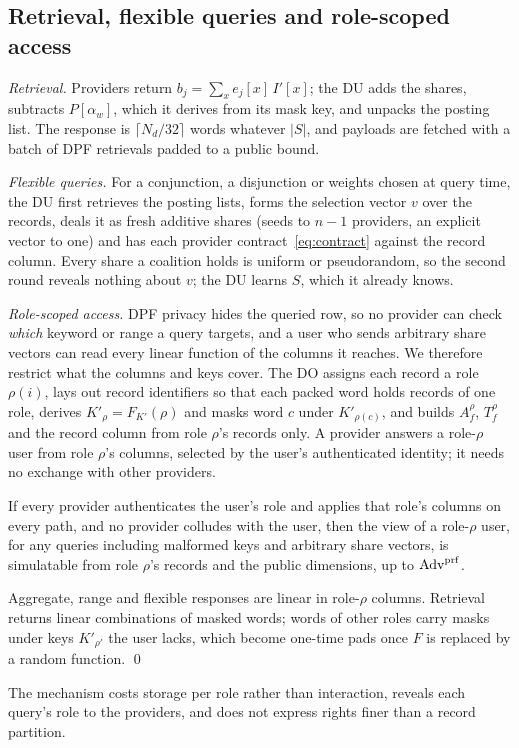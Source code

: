 \subsection{Retrieval, flexible queries and role-scoped access}
\label{sec:auth}
\emph{Retrieval.} Providers return $b_j=\sum_x e_j[x]\,I'[x]$; the DU adds the
shares, subtracts $P[\alpha_w]$, which it derives from its mask key, and
unpacks the posting list. The response is $\lceil N_d/32\rceil$ words whatever
$|S|$, and payloads are fetched with a batch of DPF retrievals padded to a
public bound.

\emph{Flexible queries.} For a conjunction, a disjunction or weights chosen at
query time, the DU first retrieves the posting lists, forms the selection
vector $v$ over the records, deals it as fresh additive shares (seeds to $n-1$
providers, an explicit vector to one) and has each provider
contract~\eqref{eq:contract} against the record column. Every share a
coalition holds is uniform or pseudorandom, so the second round reveals
nothing about $v$; the DU learns $S$, which it already knows.

\emph{Role-scoped access.} DPF privacy hides the queried row, so no provider can
check \emph{which} keyword or range a query targets, and a user who sends
arbitrary share vectors can read every linear function of the columns it
reaches. We therefore restrict what the columns and keys cover. The DO assigns
each record a role $\rho(i)$, lays out record identifiers so that each packed
word holds records of one role, derives $K'_\rho=F_{K'}(\rho)$ and masks word
$c$ under $K'_{\rho(c)}$, and builds $A^{\rho}_f$, $T^{\rho}_f$ and the record
column from role $\rho$'s records only. A provider answers a role-$\rho$ user
from role $\rho$'s columns, selected by the user's authenticated identity; it
needs no exchange with other providers.

\begin{proposition}
\label{prop:role}
If every provider authenticates the user's role and applies that role's
columns on every path, and no provider colludes with the user, then the view of
a role-$\rho$ user, for any queries including malformed keys and arbitrary
share vectors, is simulatable from role $\rho$'s records and the public
dimensions, up to $\mathrm{Adv}^{\mathrm{prf}}$.
\end{proposition}
\begin{pf}
Aggregate, range and flexible responses are linear in role-$\rho$ columns.
Retrieval returns linear combinations of masked words; words of other roles
carry masks under keys $K'_{\rho'}$ the user lacks, which become one-time pads
once $F$ is replaced by a random function. \qed
\end{pf}
The mechanism costs storage per role rather than interaction, reveals each
query's role to the providers, and does not express rights finer than a record
partition.

